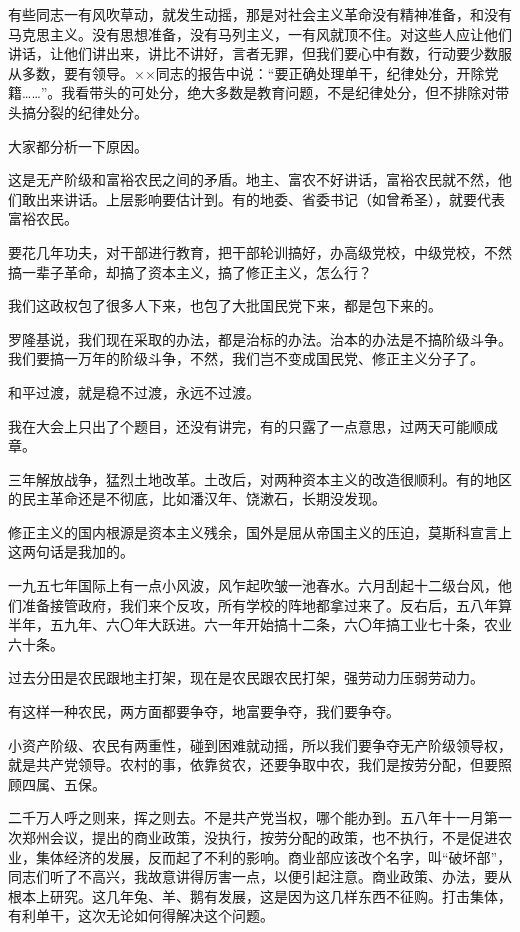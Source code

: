 有些同志一有风吹草动，就发生动摇，那是对社会主义革命没有精神准备，和没有马克思主义。没有思想准备，没有马列主义，一有风就顶不住。对这些人应让他们讲话，让他们讲出来，讲比不讲好，言者无罪，但我们要心中有数，行动要少数服从多数，要有领导。××同志的报告中说：“要正确处理单干，纪律处分，开除党籍……”。我看带头的可处分，绝大多数是教育问题，不是纪律处分，但不排除对带头搞分裂的纪律处分。

大家都分析一下原因。

这是无产阶级和富裕农民之间的矛盾。地主、富农不好讲话，富裕农民就不然，他们敢出来讲话。上层影响要估计到。有的地委、省委书记（如曾希圣），就要代表富裕农民。

要花几年功夫，对干部进行教育，把干部轮训搞好，办高级党校，中级党校，不然搞一辈子革命，却搞了资本主义，搞了修正主义，怎么行？

我们这政权包了很多人下来，也包了大批国民党下来，都是包下来的。

罗隆基说，我们现在采取的办法，都是治标的办法。治本的办法是不搞阶级斗争。我们要搞一万年的阶级斗争，不然，我们岂不变成国民党、修正主义分子了。

和平过渡，就是稳不过渡，永远不过渡。

我在大会上只出了个题目，还没有讲完，有的只露了一点意思，过两天可能顺成章。

三年解放战争，猛烈土地改革。土改后，对两种资本主义的改造很顺利。有的地区的民主革命还是不彻底，比如潘汉年、饶漱石，长期没发现。

修正主义的国内根源是资本主义残余，国外是屈从帝国主义的压迫，莫斯科宣言上这两句话是我加的。

一九五七年国际上有一点小风波，风乍起吹皱一池春水。六月刮起十二级台风，他们准备接管政府，我们来个反攻，所有学校的阵地都拿过来了。反右后，五八年算半年，五九年、六〇年大跃进。六一年开始搞十二条，六〇年搞工业七十条，农业六十条。

过去分田是农民跟地主打架，现在是农民跟农民打架，强劳动力压弱劳动力。

有这样一种农民，两方面都要争夺，地富要争夺，我们要争夺。

小资产阶级、农民有两重性，碰到困难就动摇，所以我们要争夺无产阶级领导权，就是共产党领导。农村的事，依靠贫农，还要争取中农，我们是按劳分配，但要照顾四属、五保。

二千万人呼之则来，挥之则去。不是共产党当权，哪个能办到。五八年十一月第一次郑州会议，提出的商业政策，没执行，按劳分配的政策，也不执行，不是促进农业，集体经济的发展，反而起了不利的影响。商业部应该改个名字，叫“破坏部”，同志们听了不高兴，我故意讲得厉害一点，以便引起注意。商业政策、办法，要从根本上研究。这几年兔、羊、鹅有发展，这是因为这几样东西不征购。打击集体，有利单干，这次无论如何得解决这个问题。

